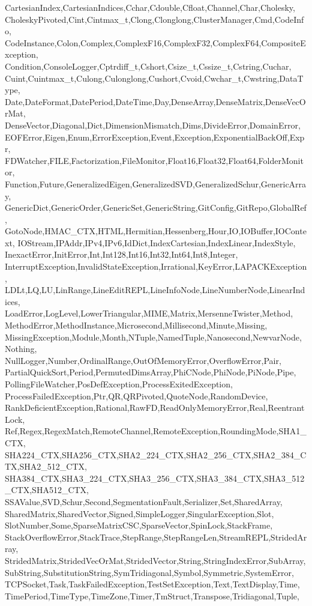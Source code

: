 {{CartesianIndex,CartesianIndices,Cchar,Cdouble,Cfloat,Channel,Char,Cholesky,%
CholeskyPivoted,Cint,Cintmax_t,Clong,Clonglong,ClusterManager,Cmd,CodeInfo,%
CodeInstance,Colon,Complex,ComplexF16,ComplexF32,ComplexF64,CompositeException,%
Condition,ConsoleLogger,Cptrdiff_t,Cshort,Csize_t,Cssize_t,Cstring,Cuchar,%
Cuint,Cuintmax_t,Culong,Culonglong,Cushort,Cvoid,Cwchar_t,Cwstring,DataType,%
Date,DateFormat,DatePeriod,DateTime,Day,DenseArray,DenseMatrix,DenseVecOrMat,%
DenseVector,Diagonal,Dict,DimensionMismatch,Dims,DivideError,DomainError,%
EOFError,Eigen,Enum,ErrorException,Event,Exception,ExponentialBackOff,Expr,%
FDWatcher,FILE,Factorization,FileMonitor,Float16,Float32,Float64,FolderMonitor,%
Function,Future,GeneralizedEigen,GeneralizedSVD,GeneralizedSchur,GenericArray,%
GenericDict,GenericOrder,GenericSet,GenericString,GitConfig,GitRepo,GlobalRef,%
GotoNode,HMAC_CTX,HTML,Hermitian,Hessenberg,Hour,IO,IOBuffer,IOContext,%
IOStream,IPAddr,IPv4,IPv6,IdDict,IndexCartesian,IndexLinear,IndexStyle,%
InexactError,InitError,Int,Int128,Int16,Int32,Int64,Int8,Integer,%
InterruptException,InvalidStateException,Irrational,KeyError,LAPACKException,%
LDLt,LQ,LU,LinRange,LineEditREPL,LineInfoNode,LineNumberNode,LinearIndices,%
LoadError,LogLevel,LowerTriangular,MIME,Matrix,MersenneTwister,Method,%
MethodError,MethodInstance,Microsecond,Millisecond,Minute,Missing,%
MissingException,Module,Month,NTuple,NamedTuple,Nanosecond,NewvarNode,Nothing,%
NullLogger,Number,OrdinalRange,OutOfMemoryError,OverflowError,Pair,%
PartialQuickSort,Period,PermutedDimsArray,PhiCNode,PhiNode,PiNode,Pipe,%
PollingFileWatcher,PosDefException,ProcessExitedException,%
ProcessFailedException,Ptr,QR,QRPivoted,QuoteNode,RandomDevice,%
RankDeficientException,Rational,RawFD,ReadOnlyMemoryError,Real,ReentrantLock,%
Ref,Regex,RegexMatch,RemoteChannel,RemoteException,RoundingMode,SHA1_CTX,%
SHA224_CTX,SHA256_CTX,SHA2_224_CTX,SHA2_256_CTX,SHA2_384_CTX,SHA2_512_CTX,%
SHA384_CTX,SHA3_224_CTX,SHA3_256_CTX,SHA3_384_CTX,SHA3_512_CTX,SHA512_CTX,%
SSAValue,SVD,Schur,Second,SegmentationFault,Serializer,Set,SharedArray,%
SharedMatrix,SharedVector,Signed,SimpleLogger,SingularException,Slot,%
SlotNumber,Some,SparseMatrixCSC,SparseVector,SpinLock,StackFrame,%
StackOverflowError,StackTrace,StepRange,StepRangeLen,StreamREPL,StridedArray,%
StridedMatrix,StridedVecOrMat,StridedVector,String,StringIndexError,SubArray,%
SubString,SubstitutionString,SymTridiagonal,Symbol,Symmetric,SystemError,%
TCPSocket,Task,TaskFailedException,TestSetException,Text,TextDisplay,Time,%
TimePeriod,TimeType,TimeZone,Timer,TmStruct,Transpose,Tridiagonal,Tuple,%
}}

